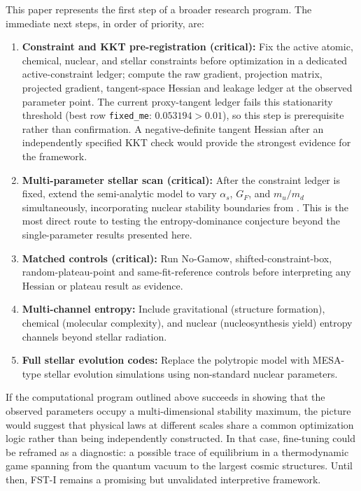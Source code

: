 \documentclass[12pt,a4paper]{article}
\theoremstyle{remark}
\begin{document}
This paper represents the first step of a broader research program. The immediate next steps, in order of priority, are:
\begin{enumerate}
    \item \textbf{Constraint and KKT pre-registration (critical):} Fix the active atomic, chemical, nuclear, and stellar constraints before optimization in a dedicated active-constraint ledger; compute the raw gradient, projection matrix, projected gradient, tangent-space Hessian and leakage ledger at the observed parameter point. The current proxy-tangent ledger fails this stationarity threshold (best row \texttt{fixed\_me}: $0.053194>0.01$), so this step is prerequisite rather than confirmation. A negative-definite tangent Hessian after an independently specified KKT check would provide the strongest evidence for the framework.
    \item \textbf{Multi-parameter stellar scan (critical):} After the constraint ledger is fixed, extend the semi-analytic model to vary $\alpha_s$, $G_F$, and $m_u/m_d$ simultaneously, incorporating nuclear stability boundaries from \citep{Adams2019}. This is the most direct route to testing the entropy-dominance conjecture beyond the single-parameter results presented here.
    \item \textbf{Matched controls (critical):} Run No-Gamow, shifted-constraint-box, random-plateau-point and same-fit-reference controls before interpreting any Hessian or plateau result as evidence.
    \item \textbf{Multi-channel entropy:} Include gravitational (structure formation), chemical (molecular complexity), and nuclear (nucleosynthesis yield) entropy channels beyond stellar radiation.
    \item \textbf{Full stellar evolution codes:} Replace the polytropic model with MESA-type stellar evolution simulations using non-standard nuclear parameters.
\end{enumerate}

If the computational program outlined above succeeds in showing that the observed parameters occupy a multi-dimensional stability maximum, the picture would suggest that physical laws at different scales share a common optimization logic rather than being independently constructed. In that case, fine-tuning could be reframed as a diagnostic: a possible trace of equilibrium in a thermodynamic game spanning from the quantum vacuum to the largest cosmic structures. Until then, FST-I remains a promising but unvalidated interpretive framework.
\end{document}
